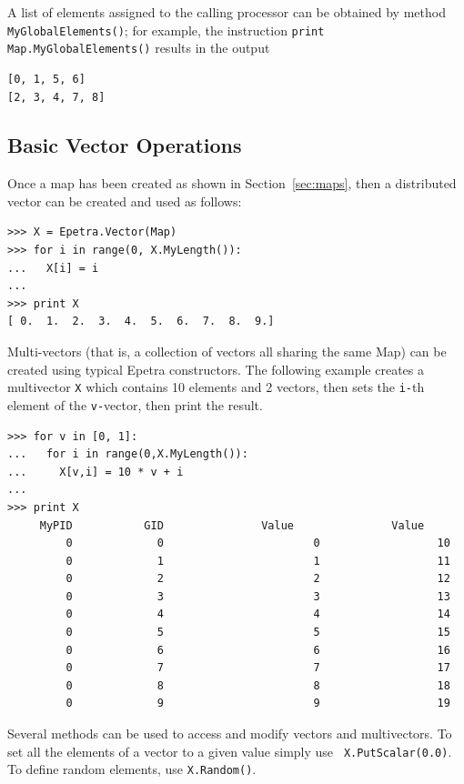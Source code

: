 \documentclass[10pt,relax]{SANDreport}
\begin{document}
A list of elements assigned to the calling processor can be obtained by method
\verb!MyGlobalElements()!; for example, the instruction 
{\tt print Map.MyGlobalElements()} results in the output
\begin{verbatim}
[0, 1, 5, 6]
[2, 3, 4, 7, 8]
\end{verbatim}

\subsection{Basic Vector Operations}
\label{sec:vectors}

Once a map has been created as shown in Section~\ref{sec:maps}, then a
distributed vector can be created and used as follows:
\begin{verbatim}
>>> X = Epetra.Vector(Map)
>>> for i in range(0, X.MyLength()):
...   X[i] = i
... 
>>> print X
[ 0.  1.  2.  3.  4.  5.  6.  7.  8.  9.]
\end{verbatim}

Multi-vectors (that is, a collection of vectors all sharing the
same Map) can be created using typical Epetra
constructors. The following example creates a multivector {\tt X} which
contains 10 elements and 2 vectors, then sets the {\tt i-}th element of the
{\tt v-}vector, then print the result.
\begin{verbatim}
>>> for v in [0, 1]:
...   for i in range(0,X.MyLength()):
...     X[v,i] = 10 * v + i
...
>>> print X
     MyPID           GID               Value               Value  
         0             0                       0                  10
         0             1                       1                  11
         0             2                       2                  12
         0             3                       3                  13
         0             4                       4                  14
         0             5                       5                  15
         0             6                       6                  16
         0             7                       7                  17
         0             8                       8                  18
         0             9                       9                  19
\end{verbatim}
Several methods can be used to access and modify vectors and multivectors.
To set all the elements of a vector to a given value simply use {\tt
  X.PutScalar(0.0)}. To define random elements, use {\tt X.Random()}.
\end{document}
